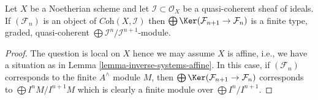 \begin{lemma}
\label{lemma-finite-over-rees-algebra}
Let $X$ be a Noetherian scheme and let $\mathcal{I} \subset \mathcal{O}_X$
be a quasi-coherent sheaf of ideals. If $(\mathcal{F}_n)$ is an object of
$\textit{Coh}(X, \mathcal{I})$ then
$\bigoplus \Ker(\mathcal{F}_{n + 1} \to \mathcal{F}_n)$ is
a finite type, graded, quasi-coherent
$\bigoplus \mathcal{I}^n/\mathcal{I}^{n + 1}$-module.
\end{lemma}

\begin{proof}
The question is local on $X$ hence we may assume $X$ is affine, i.e.,
we have a situation as in Lemma \ref{lemma-inverse-systems-affine}.
In this case, if $(\mathcal{F}_n)$ corresponds to the finite $A^\wedge$
module $M$, then $\bigoplus \Ker(\mathcal{F}_{n + 1} \to \mathcal{F}_n)$
corresponds to $\bigoplus I^nM/I^{n + 1}M$ which is clearly a finite
module over $\bigoplus I^n/I^{n + 1}$.
\end{proof}
